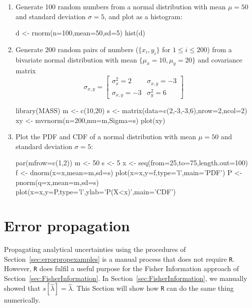 \begin{enumerate}
  \item Generate 100 random numbers from a normal distribution with
    mean $\mu=50$ and standard deviation $\sigma=5$, and plot as a
    histogram:

\begin{script}
d <- rnorm(n=100,mean=50,sd=5)
hist(d)  
\end{script}

\item Generate 200 random pairs of numbers ($\{x_i,y_i\}$ for
  $1\leq{i}\leq{200}$) from a bivariate normal distribution with mean
  $\{\mu_x=10,\mu_y=20\}$ and covariance matrix
  \[
  \sigma_{x,y} = \left[
    \begin{array}{cc}
      \sigma_x^2 = 2 & \sigma_{x,y} = -3 \\
      \sigma_{x,y} = -3 & \sigma_y^2 = 6
    \end{array}
    \right]
  \]

\begin{script}
library(MASS)
m <- c(10,20)
s <- matrix(data=c(2,-3,-3,6),nrow=2,ncol=2)
xy <- mvrnorm(n=200,mu=m,Sigma=s)
plot(xy)
\end{script}

\item Plot the PDF and CDF of a normal distribution with mean $\mu=50$
  and standard deviation $\sigma=5$:

\begin{script}
par(mfrow=c(1,2))
m <- 50
s <- 5
x <- seq(from=25,to=75,length.out=100)
f <- dnorm(x=x,mean=m,sd=s)
plot(x=x,y=f,type='l',main='PDF')
P <- pnorm(q=x,mean=m,sd=s) 
plot(x=x,y=P,type='l',ylab='P(X<x)',main='CDF')
\end{script}

\end{enumerate}

\section{Error propagation}
\label{sec:R-errorprop}

Propagating analytical uncertainties using the procedures of
Section~\ref{sec:errorpropexamples} is a manual process that does not
require \texttt{R}. However, \texttt{R} does fulfil a useful purpose
for the Fisher Information approach of
Section~\ref{sec:FisherInformation}. In
Section~\ref{sec:FisherInformation}, we manually showed that
$s[\hat{\lambda}] = \hat{\lambda}$. This Section will show how
\texttt{R} can do the same thing numerically.

